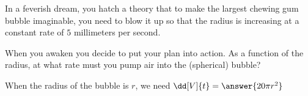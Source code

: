 \documentclass{ximera}
\author{Steven Gubkin}
\begin{document}
\begin{exercise}



In a feverish dream, you hatch a theory that to make the largest
chewing gum bubble imaginable, you need to blow it up so that the
radius is increasing at a constant rate of $5$ millimeters per second.
	 
When you awaken you decide to put your plan into action.  As a
function of the radius, at what rate must you pump air into the
(spherical) bubble?

\begin{prompt}
  When the radius of the bubble is $r$, we need $\dd[V]{t} = \answer{20\pi r^2}$
\end{prompt}

\end{exercise}
\end{document}
